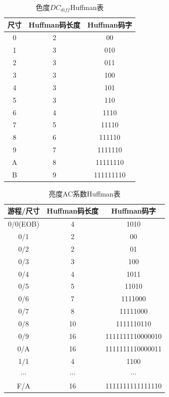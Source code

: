 \documentclass{article}
\numberwithin {equation}{section}
\begin{document}
\begin{spacing}{1.25}
      \begin{table}[H]
        \centering
        \caption{色度$DC_{diff}$Huffman表}
        \begin{tabular}{ccc}
          \toprule
          尺寸  & Huffman码长度 & Huffman码字\\
          \midrule
          0     & 2             & 00\\
          1     & 3             & 010\\
          2     & 3             & 011\\
          3     & 3             & 100\\
          4     & 3             & 101\\
          5     & 3             & 110\\
          6     & 4             & 1110\\
          7     & 5             & 11110\\
          8     & 6             & 111110\\
          9     & 7             & 1111110\\
          A     & 8             & 11111110\\
          B     & 9             & 111111110\\
          \bottomrule
        \end{tabular}
      \end{table}

      \begin{table}[H]
        \centering
        \caption{亮度AC系数Huffman表}
        \begin{tabular}{ccc}
          \toprule
          游程/尺寸 & Huffman码长度 & Huffman码字\\
          \midrule
          0/0(EOB)  & 4             & 1010\\
          0/1       & 2             & 00\\
          0/2       & 2             & 01\\
          0/3       & 3             & 100\\
          0/4       & 4             & 1011\\
          0/5       & 5             & 11010\\
          0/6       & 7             & 1111000\\
          0/7       & 8             & 11111000\\
          0/8       & 10            & 1111110110\\
          0/9       & 16            & 1111111110000010\\
          0/A       & 16            & 1111111110000011\\
          1/1       & 4             & 1100\\
          $\cdots$  & $\cdots$      & $\cdots$\\
          F/A       & 16            & 1111111111111110\\
          \bottomrule
        \end{tabular}
      \end{table}


\end{spacing}
\end{document}
